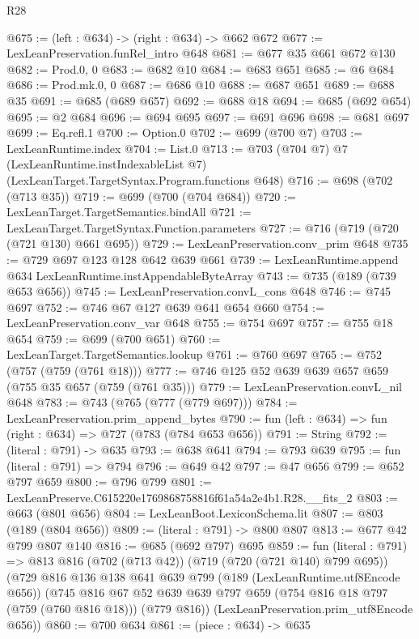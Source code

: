 \begin{lexlean}{R28}
\begin{coremodule}
@675 := (left : @634) -> (right : @634) -> @662 @672
@677 := LexLeanPreservation.funRel_intro @648
@681 := @677 @35 @661 @672 @130
@682 := Prod.{0, 0}
@683 := @682 @10
@684 := @683 @651
@685 := @6 @684
@686 := Prod.mk.{0, 0}
@687 := @686 @10
@688 := @687 @651
@689 := @688 @35
@691 := @685 (@689 @657)
@692 := @688 @18
@694 := @685 (@692 @654)
@695 := @2 @684
@696 := @694 @695
@697 := @691 @696
@698 := @681 @697
@699 := Eq.refl.{1}
@700 := Option.{0}
@702 := @699 (@700 @7)
@703 := LexLeanRuntime.index
@704 := List.{0}
@713 := @703
    (@704 @7)
    @7
    (LexLeanRuntime.instIndexableList @7)
    (LexLeanTarget.TargetSyntax.Program.functions @648)
@716 := @698 (@702 (@713 @35))
@719 := @699 (@700 (@704 @684))
@720 := LexLeanTarget.TargetSemantics.bindAll
@721 := LexLeanTarget.TargetSyntax.Function.parameters
@727 := @716 (@719 (@720 (@721 @130) @661 @695))
@729 := LexLeanPreservation.conv_prim @648
@735 := @729 @697 @123 @128 @642 @639 @661
@739 := LexLeanRuntime.append @634 LexLeanRuntime.instAppendableByteArray
@743 := @735 (@189 (@739 @653 @656))
@745 := LexLeanPreservation.convL_cons @648
@746 := @745 @697
@752 := @746 @67 @127 @639 @641 @654 @660
@754 := LexLeanPreservation.conv_var @648
@755 := @754 @697
@757 := @755 @18 @654
@759 := @699 (@700 @651)
@760 := LexLeanTarget.TargetSemantics.lookup
@761 := @760 @697
@765 := @752 (@757 (@759 (@761 @18)))
@777 := @746 @125 @52 @639 @639 @657 @659 (@755 @35 @657 (@759 (@761 @35)))
@779 := LexLeanPreservation.convL_nil @648
@783 := @743 (@765 (@777 (@779 @697)))
@784 := LexLeanPreservation.prim_append_bytes
@790 := fun (left : @634) => fun (right : @634) => @727 (@783 (@784 @653 @656))
@791 := String
@792 := (literal : @791) -> @635
@793 := @638 @641
@794 := @793 @639
@795 := fun (literal : @791) => @794
@796 := @649 @42
@797 := @47 @656
@799 := @652 @797 @659
@800 := @796 @799
@801 := LexLeanPreserve.C615220e1769868758816f61a54a2e4b1.R28.__fits_2
@803 := @663 (@801 @656)
@804 := LexLeanBoot.LexiconSchema.lit
@807 := @803 (@189 (@804 @656))
@809 := (literal : @791) -> @800 @807
@813 := @677 @42 @799 @807 @140
@816 := @685 (@692 @797) @695
@859 := fun (literal : @791) =>
  @813
    @816
    (@702 (@713 @42))
    (@719 (@720 (@721 @140) @799 @695))
    (@729
      @816
      @136
      @138
      @641
      @639
      @799
      (@189 (LexLeanRuntime.utf8Encode @656))
      (@745
        @816
        @67
        @52
        @639
        @639
        @797
        @659
        (@754 @816 @18 @797 (@759 (@760 @816 @18)))
        (@779 @816))
      (LexLeanPreservation.prim_utf8Encode @656))
@860 := @700 @634
@861 := (piece : @634) -> @635

\end{coremodule}
\end{lexlean}
